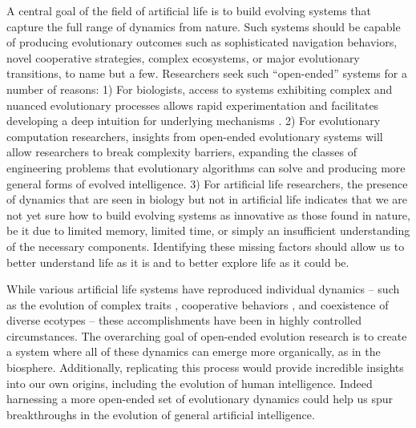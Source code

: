 \documentclass[letterpaper]{article}
\begin{document}
A central goal of the field of artificial life is to build evolving systems that capture the full range of dynamics from nature. Such systems should be capable of producing evolutionary outcomes such as sophisticated navigation behaviors, novel cooperative strategies, complex ecosystems, or major evolutionary transitions, to name but a few. Researchers seek such ``open-ended'' systems for a number of reasons:
1) For biologists, access to systems exhibiting complex and nuanced evolutionary processes allows rapid experimentation and facilitates developing a deep intuition for underlying mechanisms \citep{tenaillon_tempo_2016}.
2) For evolutionary computation researchers, insights from open-ended evolutionary systems will allow researchers to break complexity barriers, expanding the classes of engineering problems that evolutionary algorithms can solve \citep{Hara:1999vo, Potter:2000dw} and producing more general forms of evolved intelligence.
3) For artificial life researchers, the presence of dynamics that are seen in biology but not in artificial life indicates that we are not yet sure how to build evolving systems as innovative as those found in nature, be it due to limited memory, limited time, or simply an insufficient understanding of the necessary components.
Identifying these missing factors should allow us to better understand life as it is and to better explore life as it could be.

While various artificial life systems have reproduced individual dynamics -- such as the evolution of complex traits \citep{Lenski:2003vy}, cooperative behaviors \citep{Goldsby:2012tz}, and coexistence of diverse ecotypes \citep{cooper_evolution_2003} -- these accomplishments have been in highly controlled circumstances. The overarching goal of open-ended evolution research is to create a system where all of these dynamics can emerge more organically, as in the biosphere. 
Additionally, replicating this process would provide incredible insights into our own origins, including the evolution of human intelligence.  Indeed harnessing a more open-ended set of evolutionary dynamics could help us spur breakthroughs in the evolution of general artificial intelligence.
\end{document}
